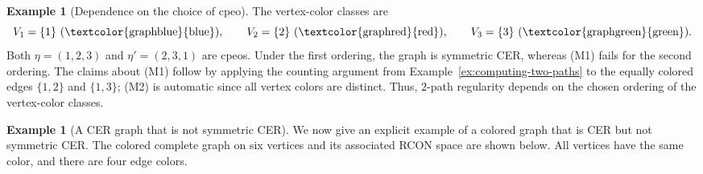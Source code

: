 \documentclass[12pt]{amsart}
\theoremstyle{plain}
\theoremstyle{definition}
\newtheorem{example}[theorem]{Example}
\theoremstyle{remark}
\newcommand{\1}{\mathbf{1}}
\begin{document}
\begin{example}[Dependence on the choice of cpeo]
The vertex-color classes are
\[
V_1=\{1\}\ \text{(\textcolor{graphblue}{blue})},\qquad
V_2=\{2\}\ \text{(\textcolor{graphred}{red})},\qquad
V_3=\{3\}\ \text{(\textcolor{graphgreen}{green})}.
\]
Both $\eta=(1,2,3)$ and $\eta'=(2,3,1)$ are cpeos. Under the first
ordering, the graph is symmetric CER, whereas (M1) fails for the second
ordering. The claims about (M1) follow by applying the counting argument
from Example~\ref{ex:computing-two-paths} to the equally colored
edges $\{1,2\}$ and $\{1,3\}$; (M2) is automatic since
all vertex colors are distinct.
Thus, $2$-path regularity depends on the chosen ordering
of the vertex-color classes.
\end{example}

\begin{example}[A CER graph that is not symmetric CER]\label{exp:not_nice}
We now give an explicit example of a colored graph that is CER but not symmetric CER.
The colored complete graph on six vertices and its associated RCON space are shown
below. All vertices have the same color, and there are four edge colors.

\begin{center}
\begin{minipage}[c]{0.35\textwidth}
    \centering


\end{minipage}
\end{center}
\end{example}
\end{document}
